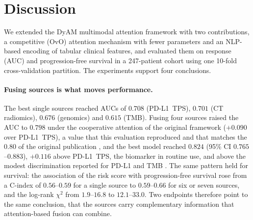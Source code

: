 \section{Discussion}
\label{sec:discussion}

We extended the DyAM multimodal attention framework with two contributions, a competitive (OvO) attention
mechanism with fewer parameters and an NLP-based encoding of tabular clinical features, and evaluated them on
response (AUC) and progression-free survival in a 247-patient cohort using one 10-fold cross-validation partition.
The experiments support four conclusions.

\paragraph{Fusing sources is what moves performance.}
The best single sources reached AUCs of $0.708$ (PD-L1~TPS), $0.701$ (CT radiomics), $0.676$ (genomics) and $0.615$ (TMB).
Fusing four sources raised the AUC to $0.798$ under the cooperative attention of the original framework
($+0.090$ over PD-L1~TPS), a value that this evaluation reproduced and that matches the $0.80$ of the original
publication \cite{Vanguri2022}, and the best model reached $0.824$ (95\% CI $0.765$--$0.883$), $+0.116$ above
PD-L1~TPS, the biomarker in routine use, and above the modest discrimination reported for PD-L1 and TMB
\cite{Lu2019,Rizvi2015}.
The same pattern held for survival: the association of the risk score with progression-free survival rose
from a C-index of $0.56$--$0.59$ for a single source to $0.59$--$0.66$ for six or seven sources, and the log-rank
$\chi^2$ from $1.9$--$16.8$ to $12.1$--$33.0$. Two endpoints therefore point to the same
conclusion, that the sources carry complementary information that attention-based fusion can combine.

